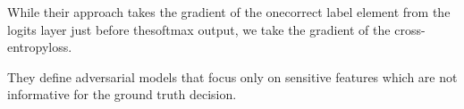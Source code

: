 While their approach takes the gradient of the onecorrect label element from the logits layer just before thesoftmax output, we take the gradient of the cross-entropyloss. 

They define adversarial models that focus only on sensitive features which are not informative for the ground truth decision. 


